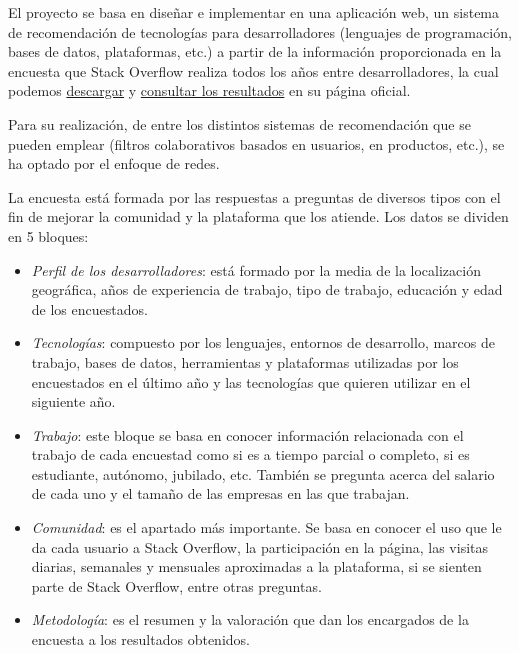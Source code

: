 
El proyecto se basa en diseñar e implementar en una aplicación web, un sistema de recomendación de tecnologías para desarrolladores (lenguajes de programación, bases de datos, plataformas, etc.) a partir de la información proporcionada en la encuesta que Stack Overflow realiza todos los años entre desarrolladores, la cual podemos \href{https://insights.stackoverflow.com/survey?_ga=2.180894375.1414322478.1650917351-879700619.1650917351}{descargar} y \href{https://insights.stackoverflow.com/survey/2021}{consultar los resultados} en su página oficial.

Para su realización, de entre los distintos sistemas de recomendación que se pueden emplear (filtros colaborativos basados en usuarios, en productos, etc.), se ha optado por el enfoque de redes.

La encuesta está formada por las respuestas a preguntas de diversos tipos con el fin de  mejorar la comunidad y la plataforma que los atiende. Los datos se dividen en 5 bloques:

\begin{itemize}
    \item \textit{Perfil de los desarrolladores}: está formado por la media de la localización geográfica, años de experiencia de trabajo, tipo de trabajo, educación y  edad de los encuestados.
    \item \textit{Tecnologías}: compuesto por los lenguajes, entornos de desarrollo, marcos de trabajo, bases de datos, herramientas y plataformas utilizadas por los encuestados en el último año y las tecnologías que quieren utilizar en el siguiente año.
    \item \textit{Trabajo}: este bloque se basa en conocer información relacionada con el trabajo de cada encuestad como si es a tiempo parcial o completo, si es estudiante, autónomo, jubilado, etc. También se pregunta acerca del salario de cada uno y el tamaño de las empresas en las que trabajan.
    \item \textit{Comunidad}: es el apartado más importante. Se basa en conocer el uso que le da cada usuario a Stack Overflow, la participación en la página, las visitas diarias, semanales y mensuales aproximadas a la plataforma, si se sienten parte de Stack Overflow, entre otras preguntas. 
    \item \textit{Metodología}: es el resumen y la valoración que dan los encargados de la encuesta a los resultados obtenidos.
\end{itemize}

